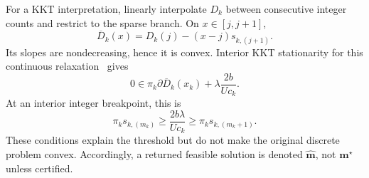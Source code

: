 For a KKT interpretation, linearly interpolate $D_k$ between consecutive integer counts and restrict to the sparse branch. On $x\in[j,j+1]$,
\begin{equation}
 \overline D_k(x)=D_k(j)-(x-j)s_{k,(j+1)}.
 \label{fkl:eq:interpolation}
\end{equation}
Its slopes are nondecreasing, hence it is convex. Interior KKT stationarity for this continuous relaxation~\cite[Sec.~5.5]{boyd} gives
\begin{equation}
 0\in\pi_k\partial\overline D_k(x_k)+\lambda\frac{2b}{Uc_k}.
 \label{fkl:eq:kkt}
\end{equation}
At an interior integer breakpoint, this is
\begin{equation}
 \pi_ks_{k,(m_k)}\ge\frac{2b\lambda}{Uc_k}
 \ge\pi_ks_{k,(m_k+1)}.
 \label{fkl:eq:kkt-threshold}
\end{equation}
These conditions explain the threshold but do not make the original discrete problem convex. Accordingly, a returned feasible solution is denoted $\widehat{\mathbf m}$, not $\mathbf m^\star$ unless certified.

